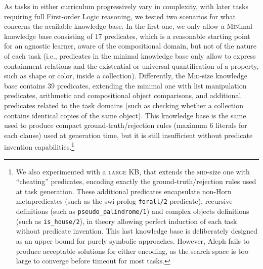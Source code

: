 %
As tasks in either curriculum progressively vary in complexity, with later tasks requiring full First-order Logic reasoning, we tested two scenarios for what concerns the available knowledge base. In the first one, we only allow a \textsc{\small Min}imal knowledge base consisting of $17$ predicates, which %
is a reasonable starting point for an agnostic learner, aware of the compositional domain, but not of the nature of each task (i.e., predicates in the minimal knowledge base only allow to express containment relations and the existential or universal quantification of a property, such as shape or color, inside a collection).
%
Differently, the \textsc{\small Mid}-size knowledge base contains $39$ predicates, extending the minimal one with list manipulation predicates, arithmetic and compositional object comparisons, and additional predicates related to the task domains (such as checking whether a collection contains identical copies of the same object). 
This knowledge base is the same used to produce compact ground-truth/rejection rules (maximum $6$ literals for each clause) used at generation time, but it is still insufficient without predicate invention capabilities.\footnote{We also experimented with a \textsc{\small large} KB, that extends the \textsc{\small mid}-size one with ``cheating'' predicates, encoding exactly the ground-truth/rejection rules used at task generation. These additional predicates encapsulate non-Horn metapredicates (such as the swi-prolog \texttt{forall/2} predicate), recursive definitions (such as \texttt{pseudo\_palindrome/1}) and complex objects definitions (such as \texttt{is\_house/2}), in theory allowing perfect induction of each task without predicate invention. This last knowledge base is deliberately designed as an upper bound for purely symbolic approaches. However, Aleph fails to produce acceptable solutions for either encoding, as the search space is too large to converge before timeout for most tasks.}
